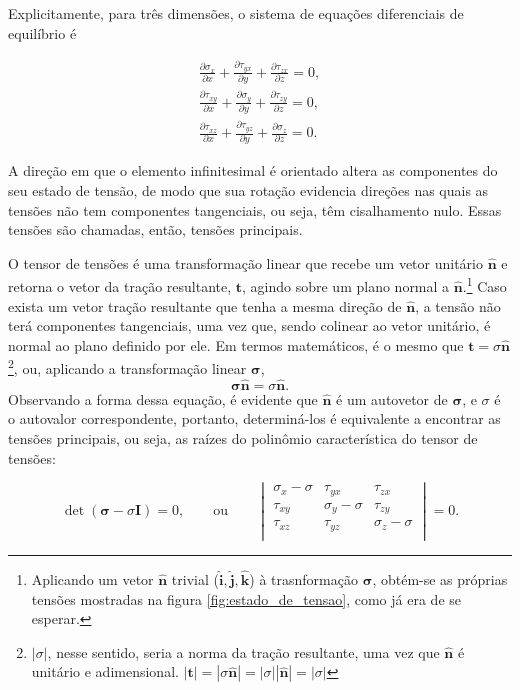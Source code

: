 Explicitamente, para três dimensões, o sistema de equações diferenciais de equilíbrio é

\begin{gather}
       \displaystyle \frac{\partial \sigma_x}{\partial x} + \frac{\partial \tau_{yx}}{\partial y} + \frac{\partial \tau_{zx}}{\partial z} = 0, \\
       \displaystyle \frac{\partial \tau_{xy}}{\partial x} + \frac{\partial \sigma_y}{\partial y} + \frac{\partial \tau_{zy}}{\partial z} = 0, \\
       \displaystyle \frac{\partial \tau_{xz}}{\partial x} + \frac{\partial \tau_{yz}}{\partial y} + \frac{\partial \sigma_z}{\partial z} = 0.
       \label{eq:equilibrio_governo}
\end{gather}


A direção em que o elemento infinitesimal é orientado altera as componentes do seu estado de tensão, de modo que sua rotação evidencia direções nas quais as tensões não tem componentes tangenciais, ou seja, têm cisalhamento nulo. Essas tensões são chamadas, então, tensões principais.

O tensor de tensões é uma transformação linear que recebe um vetor unitário $\bm{\hat{n}}$ e retorna o vetor da tração resultante, $\bm{t}$, agindo sobre um plano normal a $\bm{\hat{n}}$.\footnote{Aplicando um vetor $\bm{\hat{n}}$ trivial ($\bm{\hat{i}}, \bm{\hat{j}}, \bm{\hat{k}}$) à trasnformação $\bm{\sigma}$, obtém-se as próprias tensões mostradas na figura \ref{fig:estado_de_tensao}, como já era de se esperar.} Caso exista um vetor tração resultante que tenha a mesma direção de $\bm{\hat{n}}$, a tensão não terá componentes tangenciais, uma vez que, sendo colinear ao vetor unitário, é normal ao plano definido por ele. Em termos matemáticos, é o mesmo que $\bm{t} = \sigma \bm{\hat{n}}$\footnote{$|\sigma|$, nesse sentido, seria a norma da tração resultante, uma vez que $\bm{\hat{n}}$ é unitário e adimensional. $ |\bm{t}| = |\sigma \bm{\hat{n}}| = |\sigma| |\bm{\hat{n}}| = |\sigma| $}, ou, aplicando a transformação linear $\bm{\sigma}$,
\begin{equation}
    \bm{\sigma}\bm{\hat{n}} = \sigma \bm{\hat{n}}.
\end{equation}
Observando a forma dessa equação, é evidente que $\bm{\hat{n}}$ é um autovetor de $\bm{\sigma}$, e $\sigma$ é o autovalor correspondente, portanto, determiná-los é equivalente a encontrar as tensões principais, ou seja, as raízes do polinômio característica do tensor de tensões:

\begin{equation}
    \det{(\bm{\sigma} - \sigma \bm{I})} = 0, \qquad \text{ou} \qquad \begin{vmatrix}
        \sigma_x - \sigma & \tau_{yx} & \tau_{zx} \\
        \tau_{xy} & \sigma_{y} - \sigma & \tau_{zy} \\
        \tau_{xz} & \tau_{yz} & \sigma_{z} - \sigma \\
    \end{vmatrix} = 0.
\end{equation}


